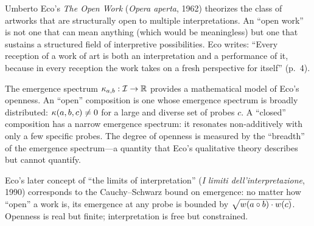 \begin{interpretation}\label{interp:ch5:eco_open_work}
Umberto Eco's \emph{The Open Work} (\emph{Opera aperta}, 1962) theorizes
the class of artworks that are structurally open to multiple
interpretations. An ``open work'' is not one that can mean anything
(which would be meaningless) but one that sustains a structured field
of interpretive possibilities. Eco writes: ``Every reception of a work
of art is both an interpretation and a performance of it, because in
every reception the work takes on a fresh perspective for itself'' (p.~4).

The emergence spectrum $\kappa_{a,b} : \mathcal{I} \to \mathbb{R}$ provides a
mathematical model of Eco's openness. An ``open'' composition is one
whose emergence spectrum is broadly distributed: $\kappa(a, b, c) \neq 0$
for a large and diverse set of probes $c$. A ``closed'' composition has
a narrow emergence spectrum: it resonates non-additively with only a few
specific probes. The degree of openness is measured by the ``breadth'' of
the emergence spectrum---a quantity that Eco's qualitative theory
describes but cannot quantify.

Eco's later concept of ``the limits of interpretation'' (\emph{I limiti
dell'interpretazione}, 1990) corresponds to the Cauchy--Schwarz bound
on emergence: no matter how ``open'' a work is, its emergence at any
probe is bounded by $\sqrt{w(a \circ b) \cdot w(c)}$. Openness is
real but finite; interpretation is free but constrained.
\end{interpretation}

